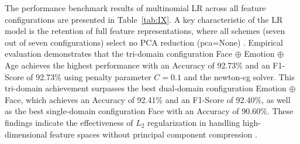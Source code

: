 The performance benchmark results of multinomial LR across all feature configurations are presented in Table~\ref{tab:IX}. A key characteristic of the LR model is the retention of full feature representations, where all schemes (seven out of seven configurations) select no PCA reduction (pca=None) \cite{ref49}. Empirical evaluation demonstrates that the tri-domain configuration Face $\oplus$ Emotion $\oplus$ Age achieves the highest performance with an Accuracy of 92.73\% and an F1-Score of 92.73\% using penalty parameter $C=0.1$ and the newton-cg solver. This tri-domain achievement surpasses the best dual-domain configuration Emotion $\oplus$ Face, which achieves an Accuracy of 92.41\% and an F1-Score of 92.40\%, as well as the best single-domain configuration Face with an Accuracy of 90.60\%. These findings indicate the effectiveness of $L_2$ regularization in handling high-dimensional feature spaces without principal component compression \cite{ref50}.

